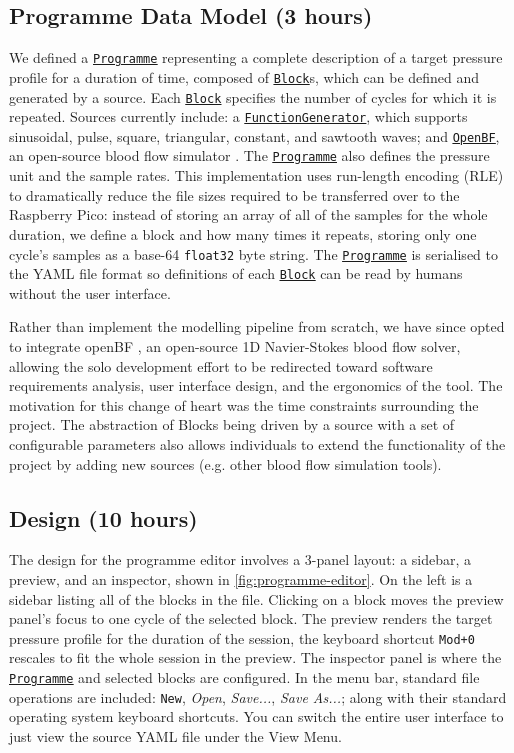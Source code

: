 \documentclass[10pt, a4paper]{article}
\newcommand{\pulsepumpdocbase}{https://pulsepump.github.io/pulsepump/api/core.html}
\newcommand{\Programme}{\underline{\href{\pulsepumpdocbase\#pulsepump.core.programme.Programme}{\texttt{Programme}}}}
\newcommand{\Block}{\underline{\href{\pulsepumpdocbase\#pulsepump.core.programme.Block}{\texttt{Block}}}}
\newcommand{\FunctionGenerator}{\underline{\href{\pulsepumpdocbase\#pulsepump.core.programme.FunctionGeneratorSource}{\texttt{FunctionGenerator}}}}
\newcommand{\OpenBF}{\underline{\href{\pulsepumpdocbase\#pulsepump.core.programme.OpenBFSource}{\texttt{OpenBF}}}}
\begin{document}
\subsection{Programme Data Model (3 hours)}

We defined a \Programme{} representing a complete description of a target pressure profile for a duration of time, composed of \Block{}s, which can be defined and generated by a source.
Each \Block{} specifies the number of cycles for which it is repeated.
Sources currently include: a \FunctionGenerator{}, which supports sinusoidal, pulse, square, triangular, constant, and sawtooth waves; and \OpenBF{}, an open-source blood flow simulator \cite{openBF.jl-2018, wreo19175}.
The \Programme{} also defines the pressure unit and the sample rates.
This implementation uses run-length encoding (RLE) to dramatically reduce the file sizes required to be transferred over to the Raspberry Pico: instead of storing an array of all of the samples for the whole duration, we define a block and how many times it repeats, storing only one cycle's samples as a base-64 \texttt{float32} byte string.
The \Programme{} is serialised to the YAML file format so definitions of each \Block{} can be read by humans without the user interface.

Rather than implement the modelling pipeline from scratch, we have since opted to integrate openBF \cite{openBF.jl-2018, wreo19175}, an open-source 1D Navier-Stokes blood flow solver, allowing the solo development effort to be redirected toward software requirements analysis, user interface design, and the ergonomics of the tool.
The motivation for this change of heart was the time constraints surrounding the project.
The abstraction of Blocks being driven by a source with a set of configurable parameters also allows individuals to extend the functionality of the project by adding new sources (e.g. other blood flow simulation tools).

\subsection{Design (10 hours)}

The design for the programme editor involves a 3-panel layout: a sidebar, a preview, and an inspector, shown in \autoref{fig:programme-editor}.
On the left is a sidebar listing all of the blocks in the file.
Clicking on a block moves the preview panel's focus to one cycle of the selected block.
The preview renders the target pressure profile for the duration of the session, the keyboard shortcut \texttt{Mod+0} rescales to fit the whole session in the preview.
The inspector panel is where the \Programme{} and selected blocks are configured.
In the menu bar, standard file operations are included: \texttt{New}, \textit{Open}, \textit{Save...}, \textit{Save As...}; along with their standard operating system keyboard shortcuts.
You can switch the entire user interface to just view the source YAML file under the View Menu.
\end{document}

